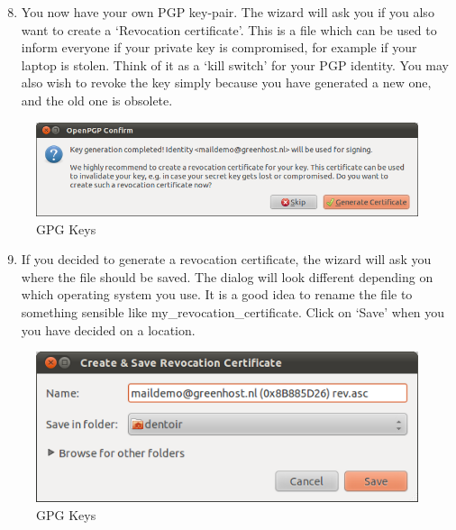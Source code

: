 \begin{enumerate}[1.]
\setcounter{enumi}{7}
\item
  You now have your own PGP key-pair. The wizard will ask you if you
  also want to create a `Revocation certificate'. This is a file which
  can be used to inform everyone if your private key is compromised, for
  example if your laptop is stolen. Think of it as a `kill switch' for
  your PGP identity. You may also wish to revoke the key simply because
  you have generated a new one, and the old one is obsolete.
\end{enumerate}
\begin{figure}[htbp]
\centering
\includegraphics{gpg_keys_8.png}
\caption{GPG Keys}
\end{figure}

\begin{enumerate}[1.]
\setcounter{enumi}{8}
\item
  If you decided to generate a revocation certificate, the wizard will
  ask you where the file should be saved. The dialog will look different
  depending on which operating system you use. It is a good idea to
  rename the file to something sensible like
  my\_revocation\_certificate. Click on `Save' when you you have decided
  on a location.
\end{enumerate}
\begin{figure}[htbp]
\centering
\includegraphics{gpg_keys_9.png}
\caption{GPG Keys}
\end{figure}

